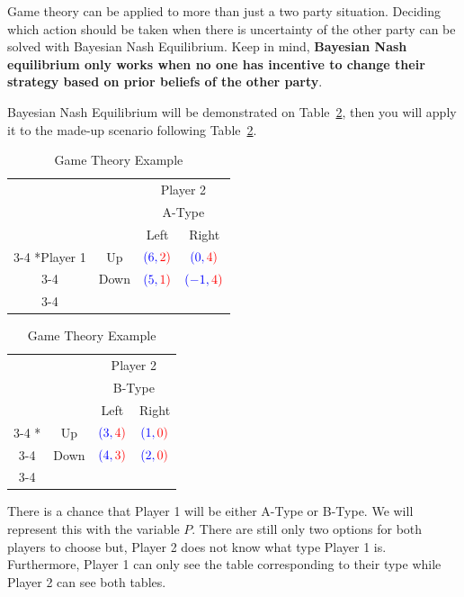 \documentclass[letterpaper,12pt]{report}
\newcounter{taskset}
\newcounter{action}[taskset]
\begin{document}
Game theory can be applied to more than just a two party situation. Deciding which action should be taken when there is uncertainty of the other party can be solved with Bayesian Nash Equilibrium. Keep in mind, \textbf{Bayesian Nash equilibrium only works when no one has incentive to change their strategy based on prior beliefs of the other party}.

\bigskip

Bayesian Nash Equilibrium will be demonstrated on Table~\ref{Tab:game_theory_1}, then you will apply it to the made-up scenario following Table~\ref{Tab:game_theory_1}.

\begin{table}[ht]
    \setlength{\extrarowheight}{2pt}
    \begin{tabular}{cc|c|c|}
      & \multicolumn{1}{c}{} & \multicolumn{2}{c}{\color{red}Player 2}\\
      & \multicolumn{1}{c}{} & \multicolumn{2}{c}{\color{red}A-Type}\\
      & \multicolumn{1}{c}{} & \multicolumn{1}{c}{\color{red}Left}  & \multicolumn{1}{c}{\color{red}Right} \\\cline{3-4}
      \multirow{2}*{\color{blue}Player 1}  & \color{blue}Up & $\color{blue}(6,\color{red}2)$ & $\color{blue}(0,\color{red}4)$ \\\cline{3-4}
      & \color{blue}Down & $\color{blue}(5,\color{red}1)$ & $\color{blue}(-1,\color{red}4)$ \\\cline{3-4}
    \end{tabular}
    \begin{tabular}{cc|c|c|}
      & \multicolumn{1}{c}{} & \multicolumn{2}{c}{\color{red}Player 2}\\
      & \multicolumn{1}{c}{} & \multicolumn{2}{c}{\color{red}B-Type}\\
      & \multicolumn{1}{c}{} & \multicolumn{1}{c}{\color{red}Left}  & \multicolumn{1}{c}{\color{red}Right} \\\cline{3-4}
      \multirow{2}*{}  & \color{blue}Up & $\color{blue}(3,\color{red}4)$ & $\color{blue}(1,\color{red}0)$ \\\cline{3-4}
      & \color{blue}Down & $\color{blue}(4,\color{red}3)$ & $\color{blue}(2,\color{red}0)$ \\\cline{3-4}
    \end{tabular}
\caption{Game Theory Example}
\label{Tab:game_theory_1}
\end{table}

There is a chance that Player 1 will be either A-Type or B-Type. We will represent this with the variable $P$. There are still only two options for both players to choose but, Player 2 does not know what type Player 1 is. Furthermore, Player 1 can only see the table corresponding to their type while Player 2 can see both tables.
\end{document}
